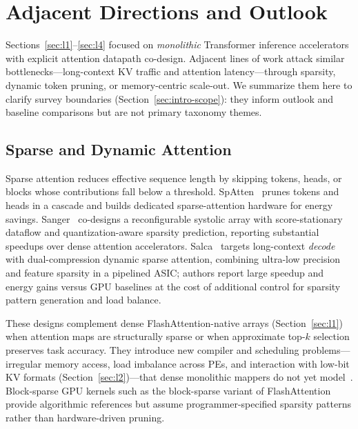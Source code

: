 \documentclass[conference]{IEEEtran}
\begin{document}
\section{Adjacent Directions and Outlook}
\label{sec:adjacent}

Sections~\ref{sec:l1}--\ref{sec:l4} focused on \emph{monolithic} Transformer inference accelerators with explicit attention datapath co-design.
Adjacent lines of work attack similar bottlenecks---long-context KV traffic and attention latency---through sparsity, dynamic token pruning, or memory-centric scale-out.
We summarize them here to clarify survey boundaries (Section~\ref{sec:intro-scope}): they inform outlook and baseline comparisons but are not primary taxonomy themes.

\subsection{Sparse and Dynamic Attention}
\label{sec:adjacent-sparse}

Sparse attention reduces effective sequence length by skipping tokens, heads, or blocks whose contributions fall below a threshold.
SpAtten~\cite{wang2021spatten} prunes tokens and heads in a cascade and builds dedicated sparse-attention hardware for energy savings.
Sanger~\cite{liu2021sanger} co-designs a reconfigurable systolic array with score-stationary dataflow and quantization-aware sparsity prediction, reporting substantial speedups over dense attention accelerators.
Salca~\cite{salca2026} targets long-context \emph{decode} with dual-compression dynamic sparse attention, combining ultra-low precision and feature sparsity in a pipelined ASIC; authors report large speedup and energy gains versus GPU baselines at the cost of additional control for sparsity pattern generation and load balance.

These designs complement dense FlashAttention-native arrays (Section~\ref{sec:l1}) when attention maps are structurally sparse or when approximate top-$k$ selection preserves task accuracy.
They introduce new compiler and scheduling problems---irregular memory access, load imbalance across PEs, and interaction with low-bit KV formats (Section~\ref{sec:l2})---that dense monolithic mappers do not yet model~\cite{liu2021sanger,salca2026,parashar2019timeloop}.
Block-sparse GPU kernels such as the block-sparse variant of FlashAttention~\cite{dao2022flashattention} provide algorithmic references but assume programmer-specified sparsity patterns rather than hardware-driven pruning.
\end{document}
